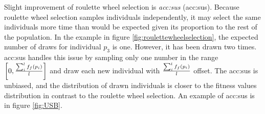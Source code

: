 Slight improvement of roulette wheel selection is \emph{\acrlong*{acc:sus}} (\acrshort{acc:sus}). Because roulette wheel selection samples individuals independently, it may select the same individuals more time than would be expected given its proportion to the rest of the population. In the example in figure \ref{fig:roulettewheelselection}, the expected number of draws for individual $p_3$ is one. However, it has been drawn two times. \acrlong{acc:sus} handles this issue by sampling only one number in the range $\left[0,\frac{\sum_i^lf_f(p_i)}{l} \right]$ and draw each new individual with $\frac{\sum_i^lf_f(p_i)}{l}$ offset. The \acrshort{acc:sus} is unbiased, and the distribution of drawn individuals is closer to the fitness values distribution in contrast to the roulette wheel selection. An example of \acrshort{acc:sus} is in figure \ref{fig:USB}.

